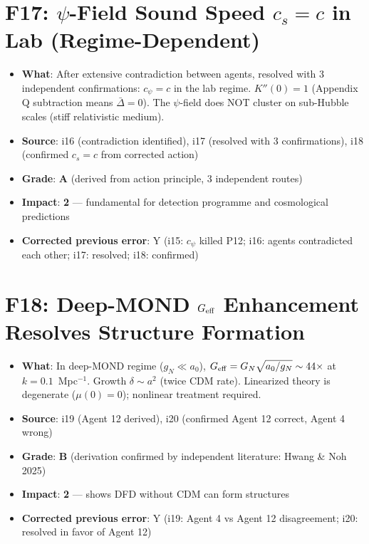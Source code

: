 \documentclass[11pt,a4paper]{article}
\newcommand{\grade}[1]{\textbf{#1}}
\newcommand{\impact}[1]{\textbf{#1}}
\begin{document}
\section{F17: $\psi$-Field Sound Speed $c_s = c$ in Lab (Regime-Dependent)}
\begin{itemize}[nosep]
\item \textbf{What}: After extensive contradiction between agents, resolved with 3 independent confirmations: $c_\psi = c$ in the lab regime. $K''(0) = 1$ (Appendix Q subtraction means $\bar{\Delta} = 0$). The $\psi$-field does NOT cluster on sub-Hubble scales (stiff relativistic medium).
\item \textbf{Source}: i16 (contradiction identified), i17 (resolved with 3 confirmations), i18 (confirmed $c_s = c$ from corrected action)
\item \textbf{Grade}: \grade{A} (derived from action principle, 3 independent routes)
\item \textbf{Impact}: \impact{2} --- fundamental for detection programme and cosmological predictions
\item \textbf{Corrected previous error}: Y (i15: $c_\psi$ killed P12; i16: agents contradicted each other; i17: resolved; i18: confirmed)
\end{itemize}

\section{F18: Deep-MOND $G_{\rm eff}$ Enhancement Resolves Structure Formation}
\begin{itemize}[nosep]
\item \textbf{What}: In deep-MOND regime ($g_N \ll a_0$), $G_{\rm eff} = G_N \sqrt{a_0/g_N} \sim 44\times$ at $k = 0.1$~Mpc$^{-1}$. Growth $\delta \sim a^2$ (twice CDM rate). Linearized theory is degenerate ($\mu(0) = 0$); nonlinear treatment required.
\item \textbf{Source}: i19 (Agent 12 derived), i20 (confirmed Agent 12 correct, Agent 4 wrong)
\item \textbf{Grade}: \grade{B} (derivation confirmed by independent literature: Hwang \& Noh 2025)
\item \textbf{Impact}: \impact{2} --- shows DFD without CDM can form structures
\item \textbf{Corrected previous error}: Y (i19: Agent 4 vs Agent 12 disagreement; i20: resolved in favor of Agent 12)
\end{itemize}
\end{document}
